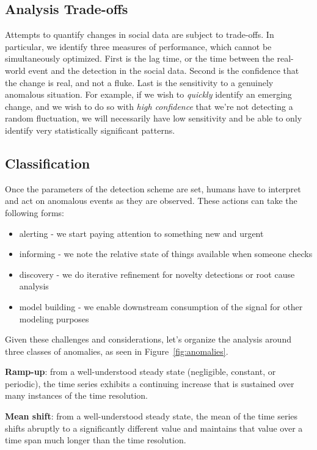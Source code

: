 \documentclass{article}
\begin{document}
\subsection{Analysis Trade-offs}
Attempts to quantify changes in social data are subject to trade-offs. In
particular, we identify three measures of performance, which cannot be
simultaneously optimized. First is the lag time, or the time between the
real-world event and the detection in the social data. Second is the confidence
that the change is real, and not a fluke. Last is the sensitivity to a
genuinely anomalous situation. For example, if we wish to \textit{quickly} identify an
emerging change, and we wish to do so with \textit{high confidence} that we’re not
detecting a random fluctuation, we will necessarily have low sensitivity and be
able to only identify very statistically significant patterns.

\subsection{Classification}
Once the parameters of the detection scheme are set, humans have to interpret
and act on anomalous events as they are observed. These actions can take the
following forms:

\begin{itemize} 
    \item alerting - we start paying attention to something new and urgent 
    \item informing - we note the relative state of things available when someone 
        checks 
    \item discovery - we do iterative refinement for novelty detections or root 
        cause analysis 
    \item model building - we enable downstream consumption of the signal for 
        other modeling purposes 
\end{itemize}

Given these challenges and considerations, let’s organize the analysis around
three classes of anomalies, as seen in Figure~\ref{fig:anomalies}.

\textbf{Ramp-up}: from a well-understood steady state (negligible, constant, or
periodic), the time series exhibits a continuing increase that is sustained
over many instances of the time resolution. 

\textbf{Mean shift}: from a well-understood steady state, the mean of the time
series shifts abruptly to a significantly different value and maintains that
value over a time span much longer than the time resolution. 
\end{document}
